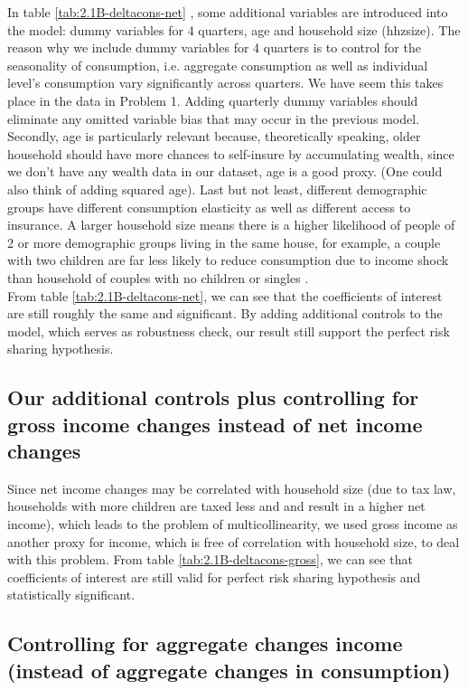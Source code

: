 \documentclass[12pt,a4paper]{article}
\begin{document}
In table \ref{tab:2.1B-deltacons-net} , some additional variables are introduced into the model: dummy variables for 4 quarters, age and household size (hhzsize). The reason why we include dummy variables for 4 quarters is to control for the seasonality of consumption, i.e. aggregate consumption as well as individual level's consumption vary significantly across quarters. We have seem this takes place in the data in Problem 1. Adding quarterly dummy variables should eliminate any omitted variable bias that may occur in the previous model. Secondly, age is particularly relevant because, theoretically speaking, older household should have more chances to self-insure by accumulating wealth, since we don't have any wealth data in our dataset, age is a good proxy. (One could also think of adding squared age). Last but not least, different demographic groups have different consumption elasticity as well as different access to insurance. A larger household size means there is a higher likelihood of people of 2 or more demographic groups living in the same house, for example, a couple with two children are far less likely to reduce consumption due to income shock than household of couples with no children or singles
. \\

From table \ref{tab:2.1B-deltacons-net}, we can see that the coefficients of interest are still roughly the same and significant. By adding additional controls to the model, which serves as robustness check, our result still support the perfect risk sharing hypothesis.

\subsection*{Our additional controls plus controlling for gross income changes instead of net income changes}
Since net income changes may be correlated with household size (due to tax law, households with more children are taxed less and and result in a higher net income), which leads to the problem of multicollinearity, we used gross income as another proxy for income, which is free of correlation with household size, to deal with this problem. From table \ref{tab:2.1B-deltacons-gross}, we can see that coefficients of interest are still valid for perfect risk sharing hypothesis and statistically significant.


\subsection*{Controlling for aggregate changes income (instead of aggregate changes in consumption)}
\end{document}
